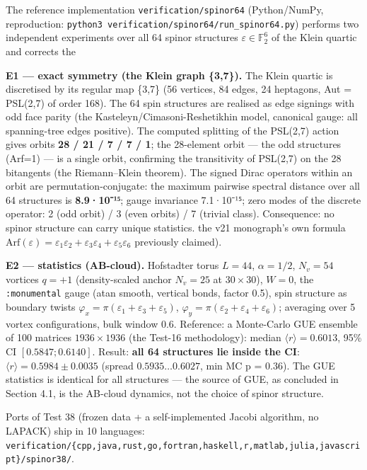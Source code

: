 \documentclass[
]{article}
\begin{document}
The reference implementation \texttt{verification/spinor64}
(Python/NumPy, reproduction:
\texttt{python3\ verification/spinor64/run\_spinor64.py}) performs two
independent experiments over all 64 spinor structures
\(\varepsilon\in\mathbb{F}_2^6\) of the Klein quartic and corrects the

\textbf{E1 --- exact symmetry (the Klein graph \{3,7\}).} The Klein
quartic is discretised by its regular map \{3,7\} (56 vertices, 84
edges, 24 heptagons, Aut = PSL(2,7) of order 168). The 64 spin
structures are realised as edge signings with odd face parity (the
Kasteleyn/Cimasoni-Reshetikhin model, canonical gauge: all spanning-tree
edges positive). The computed splitting of the PSL(2,7) action gives
orbits \textbf{28 / 21 / 7 / 7 / 1}; the 28-element orbit --- the odd
structures (Arf=1) --- is a single orbit, confirming the transitivity of
PSL(2,7) on the 28 bitangents (the Riemann--Klein theorem). The signed
Dirac operators within an orbit are permutation-conjugate: the maximum
pairwise spectral distance over all 64 structures is \textbf{8.9·10⁻¹⁵};
gauge invariance 7.1·10⁻¹⁵; zero modes of the discrete operator: 2 (odd
orbit) / 3 (even orbits) / 7 (trivial class). Consequence: no spinor
structure can carry unique statistics.
the v21 monograph's own formula
\(\mathrm{Arf}(\varepsilon)=\varepsilon_1\varepsilon_2+\varepsilon_3\varepsilon_4+\varepsilon_5\varepsilon_6\)
previously claimed).

\textbf{E2 --- statistics (AB-cloud).} Hofstadter torus \(L=44\),
\(\alpha=1/2\), \(N_v=54\) vortices \(q=+1\) (density-scaled anchor
\(N_v=25\) at \(30\times30\)), \(W=0\), the \texttt{:monumental} gauge
(atan smooth, vertical bonds, factor 0.5), spin structure as boundary
twists \(\varphi_x=\pi(\varepsilon_1+\varepsilon_3+\varepsilon_5)\),
\(\varphi_y=\pi(\varepsilon_2+\varepsilon_4+\varepsilon_6)\); averaging
over 5 vortex configurations, bulk window 0.6. Reference: a Monte-Carlo
GUE ensemble of 100 matrices \(1936\times1936\) (the Test-16
methodology): median \(\langle r\rangle = 0.6013\), 95\% CI
\([0.5847; 0.6140]\). Result: \textbf{all 64 structures lie inside the
CI}: \(\langle r\rangle =
0.5984\pm0.0035\) (spread \(0.5935\dots0.6027\), min MC p = 0.36). The
GUE statistics is identical for all structures --- the source of GUE, as
concluded in Section 4.1, is the AB-cloud dynamics, not the choice of
spinor structure.

Ports of Test 38 (frozen data + a self-implemented Jacobi algorithm, no
LAPACK) ship in 10 languages:
\texttt{verification/\{cpp,java,rust,go,fortran,haskell,r,matlab,julia,javascript\}/spinor38/}.
\end{document}
